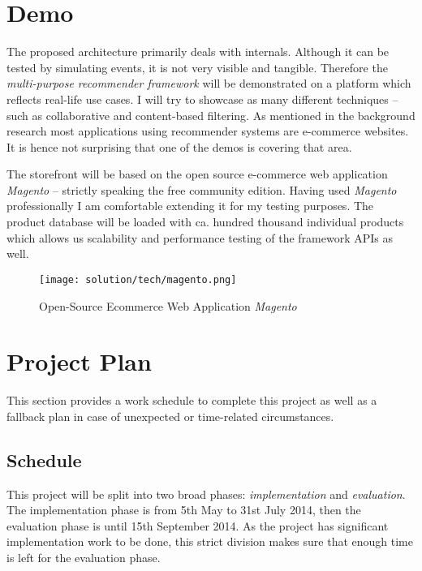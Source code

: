 \section{Demo}

The proposed architecture primarily deals with internals. Although it can be tested by simulating events, it is not very visible and tangible. Therefore the \emph{multi-purpose recommender framework} will be demonstrated on a platform which reflects real-life use cases. I will try to showcase as many different techniques -- such as collaborative and content-based filtering. As mentioned in the background research most applications using recommender systems are e-commerce websites. It is hence not surprising that one of the demos is covering that area.

The storefront will be based on the open source e-commerce web application \emph{Magento} -- strictly speaking the free community edition. Having used \emph{Magento} professionally I am comfortable extending it for my testing purposes. The product database will be loaded with ca. hundred thousand individual products which allows us scalability and performance testing of the framework APIs as well.

\begin{figure}[ht]
    \texttt{[image: solution/tech/magento.png]}
    \caption{Open-Source Ecommerce Web Application \emph{Magento}}
    \label{fig:magento}
\end{figure}



\section{Project Plan}

This section provides a work schedule to complete this project as well as a fallback plan in case of unexpected or time-related circumstances.

\subsection{Schedule}

This project will be split into two broad phases: \emph{implementation} and \emph{evaluation}. The implementation phase is from 5th May to 31st July 2014, then the evaluation phase is until 15th September 2014. As the project has significant implementation work to be done, this strict division makes sure that enough time is left for the evaluation phase.

